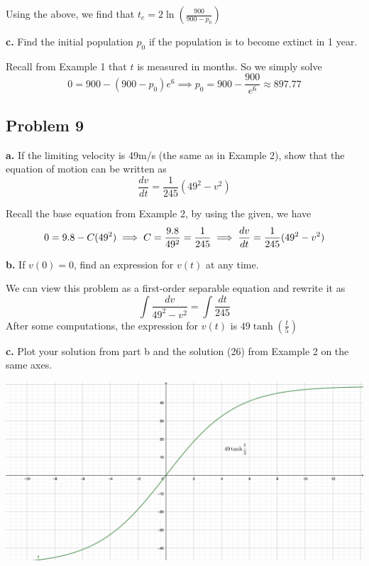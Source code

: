 \documentclass[12pt]{article}
\begin{document}
Using the above, we find that \(t_e = 2 \ln(\frac{900}{900-p_0})\)

\textbf{c.} Find the initial population \(p_0\) if the population is to become extinct in
1 year.

Recall from Example 1 that \(t\) is measured in months. So we simply solve
\begin{equation*}
        0 = 900 - (900-p_0)e^{6} \implies p_0 = 900 - \frac{900}{e^6} \approx 897.77
\end{equation*}
\subsection*{Problem 9}
\label{sec:orgd3bb4f6}
\textbf{a.} If the limiting velocity is 49m/s (the same as in Example 2), show that
 the equation of motion can be written as
\begin{equation*}
  \frac{dv}{dt} = \frac{1}{245}(49^2-v^2)
\end{equation*}

Recall the base equation from Example 2, by using the given, we have
\begin{equation*}
  0 = 9.8 - C (49^2) \implies C = \frac{9.8}{49^2} = \frac{1}{245}\\
  \implies \frac{dv}{dt} = \frac{1}{245}(49^2-v^2)
\end{equation*}

\textbf{b.} If \(v(0) = 0\), find an expression for \(v(t)\) at any time.

We can view this problem as a first-order separable equation and rewrite it
as
\begin{equation*}
        \int{\frac{dv}{49^2-v^2}} = \int{\frac{dt}{245}}
\end{equation*}
After some computations, the expression for \(v(t)\) is
\(49\tanh(\frac{t}{5})\)

\textbf{c.} Plot your solution from part b and the solution (26) from Example 2 on
the same axes.

\begin{center}
\includegraphics[width=.9\linewidth]{./tanh.png}
\end{center}
\end{document}
